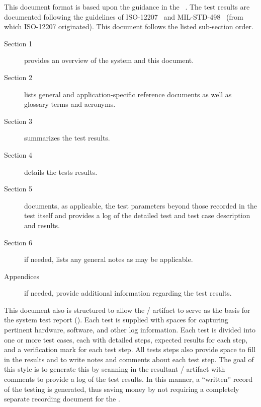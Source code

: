 
This document format is based upon the guidance in the \STR{} \DID~\cite{ref__STR_DID}.
The test results are documented following the guidelines of ISO-12207~\cite{ref__ISO_12207} and MIL-STD-498~\cite{ref__MIL_STD_498} (from which ISO-12207 originated).
This document follows the listed \STD sub-section order.
\begin{description}
	\item[Section 1] provides an overview of the system and this document.
	\item[Section 2] lists general and application-specific reference documents as well as glossary terms and acronyms. 
	\item[Section 3] summarizes the test results.
	\item[Section 4] details the tests results. 
	\item[Section 5] documents, as applicable, the test parameters beyond those recorded in the test itself and provides a log of the detailed test and test case description and results.
	\item[Section 6] if needed, lists any general notes as may be applicable.
	\item[Appendices] if needed, provide additional information regarding the test results.
\end{description}


This document also is structured to allow the \STD / \STS artifact to serve as the basis for the system test report (\STR).
Each test is supplied with spaces for capturing pertinent hardware, software, and other log information.
Each test is divided into one or more test cases, each with detailed steps, expected results for each step, and a verification mark for each test step.
All tests steps also provide space to fill in the results and to write notes and comments about each test step.
The goal of this style is to generate this \STR by scanning in the resultant \STD / \STS artifact with comments to provide a log of the test results.
In this manner, a ``written'' record of the testing is generated, thus saving money by not requiring a completely separate recording document for the \STR.
